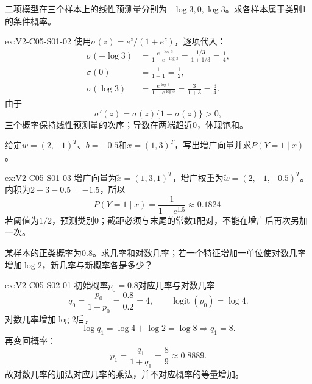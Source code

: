\begin{SLChapterExercisePairSection}
\begin{exercise}\label{ex:V2-C05-S01-02}
二项模型在三个样本上的线性预测量分别为$-\log3,0,\log3$。求各样本属于类别1的条件概率。
\end{exercise}
\ifSLFullEdition
{}\label{sol:V2-C05-S01-02}
\begin{chapterexercisesolution}{ex:V2-C05-S01-02}
使用$\sigma(z)=e^z/(1+e^z)$，逐项代入：
\[
\begin{aligned}
\sigma(-\log3)
&=\frac{e^{-\log3}}{1+e^{-\log3}}
=\frac{1/3}{1+1/3}=\frac14,\\
\sigma(0)&=\frac{1}{1+1}=\frac12,\\
\sigma(\log3)
&=\frac{e^{\log3}}{1+e^{\log3}}
=\frac3{1+3}=\frac34.
\end{aligned}
\]
由于
\[
\sigma'(z)=\sigma(z)\{1-\sigma(z)\}>0,
\]
三个概率保持线性预测量的次序；导数在两端趋近0，体现饱和。
\end{chapterexercisesolution}
\fi

\begin{exercise}\label{ex:V2-C05-S01-03}
给定$w=(2,-1)^T$、$b=-0.5$和$x=(1,3)^T$，写出增广向量并求$P(Y=1\mid x)$。
\end{exercise}
\ifSLFullEdition
{}\label{sol:V2-C05-S01-03}
\begin{chapterexercisesolution}{ex:V2-C05-S01-03}
增广向量为$\widetilde x=(1,3,1)^T$，增广权重为$\widetilde w=(2,-1,-0.5)^T$。内积为$2-3-0.5=-1.5$，所以
\[
P(Y=1\mid x)=\frac{1}{1+e^{1.5}}\approx0.1824.
\]
若阈值为$1/2$，预测类别0；截距必须与末尾的常数1配对，不能在增广后再次另加一次。
\end{chapterexercisesolution}
\fi

\begin{exercise}\label{ex:V2-C05-S02-01}
某样本的正类概率为$0.8$。求几率和对数几率；若一个特征增加一单位使对数几率增加$\log2$，新几率与新概率各是多少？
\end{exercise}
\ifSLFullEdition
{}\label{sol:V2-C05-S02-01}
\begin{chapterexercisesolution}{ex:V2-C05-S02-01}
初始概率$p_0=0.8$对应几率与对数几率
\[
q_0=\frac{p_0}{1-p_0}=\frac{0.8}{0.2}=4,
\qquad
\operatorname{logit}(p_0)=\log4.
\]
对数几率增加$\log2$后，
\[
\log q_1=\log4+\log2=\log8
\Longrightarrow
q_1=8.
\]
再变回概率：
\[
p_1=\frac{q_1}{1+q_1}=\frac89\approx0.8889.
\]
故对数几率的加法对应几率的乘法，并不对应概率的等量增加。
\end{chapterexercisesolution}
\fi


\end{SLChapterExercisePairSection}
